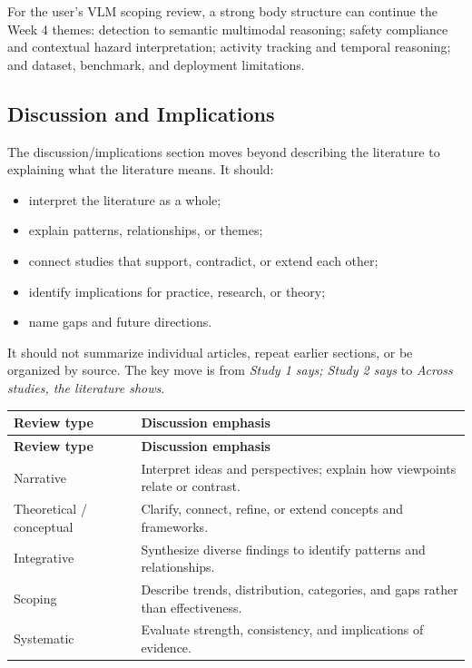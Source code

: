 \documentclass[10pt,letterpaper]{article}
\begin{document}
For the user's VLM scoping review, a strong body structure can continue the Week 4 themes: detection to semantic multimodal reasoning; safety compliance and contextual hazard interpretation; activity tracking and temporal reasoning; and dataset, benchmark, and deployment limitations.

\subsection{Discussion and Implications}

The discussion/implications section moves beyond describing the literature to explaining what the literature means. It should:

\begin{itemize}
\item interpret the literature as a whole;
\item explain patterns, relationships, or themes;
\item connect studies that support, contradict, or extend each other;
\item identify implications for practice, research, or theory;
\item name gaps and future directions.
\end{itemize}

It should not summarize individual articles, repeat earlier sections, or be organized by source. The key move is from \emph{Study 1 says; Study 2 says} to \emph{Across studies, the literature shows}.

\begin{longtable}{L{3.6cm} L{9.9cm}}
\toprule
{}
\textbf{Review type} & \textbf{Discussion emphasis}\\
\midrule
\endfirsthead
\toprule
{}
\textbf{Review type} & \textbf{Discussion emphasis}\\
\midrule
\endhead
\bottomrule
\endfoot
Narrative & Interpret ideas and perspectives; explain how viewpoints relate or contrast.\\
Theoretical / conceptual & Clarify, connect, refine, or extend concepts and frameworks.\\
Integrative & Synthesize diverse findings to identify patterns and relationships.\\
Scoping & Describe trends, distribution, categories, and gaps rather than effectiveness.\\
Systematic & Evaluate strength, consistency, and implications of evidence.\\
\end{longtable}
\end{document}
